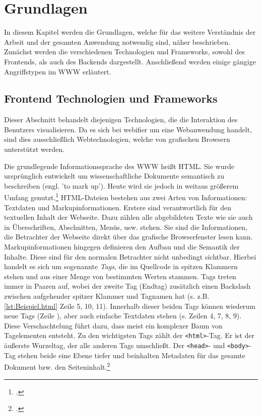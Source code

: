 \chapter{Grundlagen}

In diesem Kapitel werden die Grundlagen, welche für das weitere Verständnis der Arbeit und der gesamten Anwendung notwendig sind, näher beschrieben. Zunächst werden die verschiedenen Technologien und Frameworks, sowohl des Frontends, als auch des Backends dargestellt. Anschließend werden einige gängige Angriffstypen im \ac{WWW} erläutert.

\section{Frontend Technologien und Frameworks}

Dieser Abschnitt behandelt diejenigen Technologien, die die Interaktion des Benutzers visualisieren. Da es sich bei webifier um eine Webanwendung handelt, sind dies ausschließlich Webtechnologien, welche von grafischen Browsern unterstützt werden.

Die grundlegende Informationssprache des \ac{WWW} heißt \ac{HTML}. Sie wurde ursprünglich entwickelt um wissenschaftliche Dokumente semantisch zu beschreiben (engl. 'to mark up').
Heute wird sie jedoch in weitaus größerem Umfang genutzt.\footcite[Vgl.][]{html5Spec}
\ac{HTML}-Dateien bestehen aus zwei Arten von Informationen: Textdaten und Markupinformationen.
Erstere sind verantwortlich für den textuellen Inhalt der Webseite. Dazu zählen alle abgebildeten Texte wie sie auch in Überschriften, Abschnitten, Menüs, usw. stehen. Sie sind die Informationen, die Betrachter der Webseite direkt über das grafische Browserfenster lesen kann.
Markupinformationen hingegen definieren den Aufbau und die Semantik der Inhalte. Diese sind für den normalen Betrachter nicht unbedingt sichtbar. Hierbei handelt es sich um sogenannte \textit{Tags}, die im Quellcode in spitzen Klammern stehen und aus einer Menge von bestimmten Werten stammen. Tags treten immer in Paaren auf, wobei der zweite Tag (Endtag) zusätzlich einen Backslash zwischen aufgehender spitzer Klammer und Tagnamen hat (s. z.B. \autoref{lst:Beispiel.html} Zeile 5, 10, 11).
Innerhalb dieser beiden Tags können wiederum neue Tags (Zeile ), aber auch einfache Textdaten stehen (s. Zeilen 4, 7, 8, 9).
Diese Verschachtelung führt dazu, dass meist ein komplexer Baum von Tagelementen entsteht. Zu den wichtigsten Tags zählt der \lstinline{<html>}-Tag. Er ist der äußerste Wurzeltag, der alle anderen Tags umschließt. Der \lstinline{<head>}- und \lstinline{<body>}-Tag stehen beide eine Ebene tiefer und beinhalten Metadaten für das gesamte Dokument bzw. den Seiteninhalt.\footcite[Vgl.][57]{webTechnologies}

